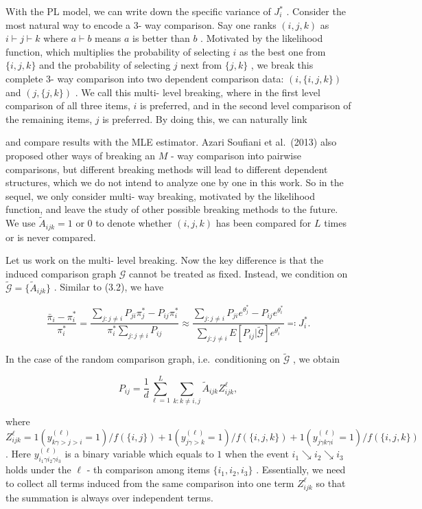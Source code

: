 With the PL model, we can write down the specific variance of
\(J_{i}^{*}\) . Consider the most natural way to encode a 3- way
comparison. Say one ranks \((i,j,k)\) as \(i\vdash j\vdash k\) where
\(a\vdash b\) means \(a\) is better than \(b\) . Motivated by the
likelihood function, which multiplies the probability of selecting \(i\)
as the best one from \(\{i,j,k\}\) and the probability of selecting
\(j\) next from \(\{j,k\}\) , we break this complete 3- way comparison
into two dependent comparison data: \((i,\{i,j,k\})\) and
\((j,\{j,k\})\) . We call this multi- level breaking, where in the first
level comparison of all three items, \(i\) is preferred, and in the
second level comparison of the remaining items, \(j\) is preferred. By
doing this, we can naturally link

and compare results with the MLE estimator. Azari Soufiani et al.~(2013)
also proposed other ways of breaking an \(M\) - way comparison into
pairwise comparisons, but different breaking methods will lead to
different dependent structures, which we do not intend to analyze one by
one in this work. So in the sequel, we only consider multi- way
breaking, motivated by the likelihood function, and leave the study of
other possible breaking methods to the future. We use
\(\widetilde{A}_{ijk} = 1\) or \(0\) to denote whether \((i,j,k)\) has
been compared for \(L\) times or is never compared.

Let us work on the multi- level breaking. Now the key difference is that
the induced comparison graph \(\mathcal{G}\) cannot be treated as fixed.
Instead, we condition on
\(\widetilde{\mathcal{G}} = \{\widetilde{A}_{ijk}\}\) . Similar to
(3.2), we have

\[
\frac{\bar{\pi}_{i} - \pi_{i}^{*}}{\pi_{i}^{*}} = \frac{\sum_{j:j\neq i}P_{ji}\pi_{j}^{*} - P_{ij}\pi_{i}^{*}}{\pi_{i}^{*}\sum_{j:j\neq i}P_{ij}}\approx \frac{\sum_{j:j\neq i}P_{ji}e^{\theta_{j}^{*}} - P_{ij}e^{\theta_{i}^{*}}}{\sum_{j:j\neq i}E[P_{ij}|\widetilde{\mathcal{G}}]e^{\theta_{i}^{*}}} \eqqcolon J_{i}^{*}. \tag{3.6}
\]

In the case of the random comparison graph, i.e.~conditioning on
\(\widetilde{\mathcal{G}}\) , we obtain

\[
P_{ij} = \frac{1}{d}\sum_{\ell = 1}^{L}\sum_{k:k\neq i,j}\widetilde{A}_{ijk}Z_{ijk}^{\ell}, \tag{3.7}
\]

where
\(Z_{ijk}^{\ell} = 1(y_{k\gamma >j > i}^{(\ell)} = 1) / f(\{i,j\}) + 1(y_{j\gamma >k}^{(\ell)} = 1) / f(\{i,j,k\}) + 1(y_{j\gamma k\gamma i}^{(\ell)} = 1) / f(\{i,j,k\})\)
. Here \(y_{i_1\gamma i_2\gamma i_3}^{(\ell)}\) is a binary variable
which equals to \(1\) when the event \(i_1\searrow i_2\searrow i_3\)
holds under the \(\ell\) - th comparison among items \(\{i_1,i_2,i_3\}\)
. Essentially, we need to collect all terms induced from the same
comparison into one term \(Z_{ijk}^{\ell}\) so that the summation is
always over independent terms.

